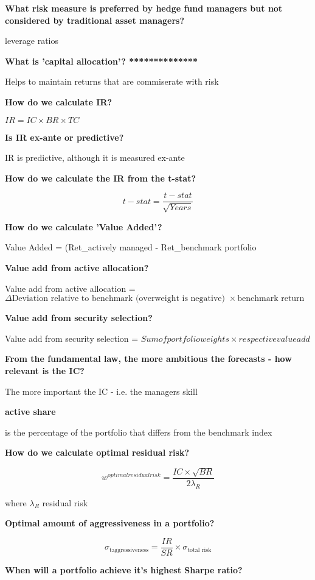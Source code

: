 \documentclass[12pt]{article}
\begin{document}
{\textbf{What risk measure is preferred by hedge fund managers but not considered by traditional asset managers?}

leverage ratios

\textbf{What is 'capital allocation'? **************}

Helps to maintain returns that are commiserate with risk



\newpage

\textbf{How do we calculate IR?}

$IR= IC \times BR \times TC$

\textbf{Is IR ex-ante or predictive?}

IR is predictive, although it is measured ex-ante

\textbf{How do we calculate the IR from the t-stat?}

$$
t-stat = \dfrac{t-stat}{\sqrt{Years}}
$$

\textbf{How do we calculate 'Value Added'?}

Value Added = (Ret_{actively managed} - Ret_{benchmark portfolio}

\textbf{Value add from active allocation?}

Value add from active allocation = $\Delta \text{Deviation relative to benchmark (overweight is negative) } \times \text{benchmark return}$

\textbf{Value add from security selection?}

Value add from security selection = $Sum of portfolio weights \times respective value add$

\textbf{From the fundamental law, the more ambitious the forecasts - how relevant is the IC?}

The more important the IC - i.e. the managers skill

\textbf{active share}

is the percentage of the portfolio that differs from the benchmark index

\textbf{How do we calculate optimal residual risk?}

$$
w^{optimal residual risk} = \dfrac{IC \times \sqrt{BR}}{2 \lambda_R}
$$

where $\lambda_R$ residual risk

\textbf{Optimal amount of aggressiveness  in a portfolio?}

	$$
	\sigma_{\text{taggressiveness}} = \dfrac{IR}{SR} \times \sigma_{\text{total risk}}
	$$
	
\textbf{When will a portfolio achieve it's highest Sharpe ratio?}

}
\end{document}
